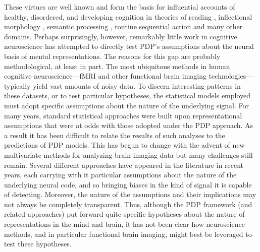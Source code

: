 These virtues are well known and form the basis for influential accounts of healthy, disordered, and developing cognition in theories of reading \cite{seidenberg_distributed_1989,harm_computing_2004}, inflectional morphology \cite{RumelhartMcClelland86pt,JoanisseSeidenberg99, plunkett_connectionist_1999}, semantic processing \cite{FarahMcClelland91,rogers_semantic_2004,rogers_structure_2004}, routine sequential action \cite{BotvinickPlaut2004} and many other domains. Perhaps surprisingly, however, remarkably little work in cognitive neuroscience has attempted to directly test PDP's assumptions about the neural basis of mental representations. The reasons for this gap are probably methodological, at least in part. The most ubiquitous methods in human cognitive neuroscience---fMRI and other functional brain imaging technologies---typically yield vast amounts of noisy data.  To discern interesting patterns in these datasets, or to test particular hypotheses, the statistical models employed must adopt specific assumptions about the nature of the underlying signal. For many years, standard statistical approaches were built upon representational assumptions that were at odds with those adopted under the PDP approach\cite{kriegeskorte_representational_2008}. As a result it has been difficult to relate the results of such analyses to the predictions of PDP models. This has begun to change with the advent of new multivariate methods for analyzing brain imaging data but many challenges still remain. Several different approaches have appeared in the literature in recent years\cite{pereira_machine_2009,kriegeskorte_information-based_2006,kriegeskorte_representational_2013,mitchell_predicting_2008}, each carrying with it particular assumptions about the nature of the underlying neural code, and so bringing biases in the kind of signal it is capable of detecting. Moreover, the nature of the assumptions and their implications may not always be completely transparent. Thus, although the PDP framework (and related approaches) put forward quite specific hypotheses about the nature of representations in the mind and brain, it has not been clear how neuroscience methods, and in particular functional brain imaging, might best be leveraged to test these hypotheses.

